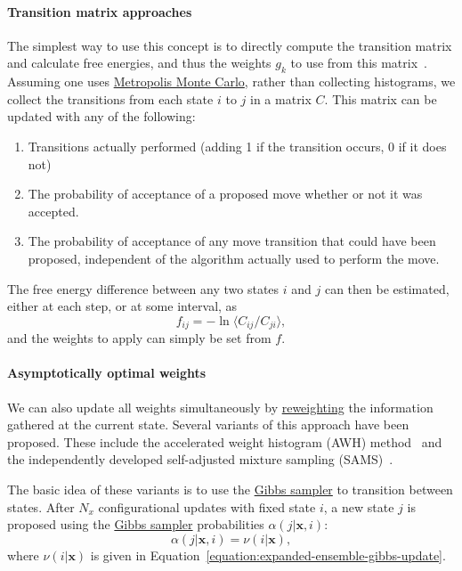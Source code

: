 \documentclass[9pt,review]{livecoms}
\newcommand{\vx}{\mathbf{x}}
\begin{document}
\paragraph{Transition matrix approaches}
The simplest way to use this concept is to directly compute the transition matrix and calculate free energies, and thus the weights $g_k$ to use from this matrix~\cite{siderius_2013}. Assuming one uses \hyperlink{ref:MetropolisMonteCarlo} {Metropolis Monte Carlo}, rather than collecting histograms, we collect the transitions from each state $i$ to $j$ in a matrix $C$. This matrix can be updated with any of the following:
\begin{enumerate}
\item Transitions actually performed (adding 1 if the transition occurs, 0 if it does not)\label{item:actual}
\item The probability of acceptance of a proposed move whether or not it was accepted.\label{item:proposal}
\item The probability of acceptance of any move transition that could have been proposed, independent of the algorithm actually used to perform the move. \label{item:transition}
\end{enumerate}

The free energy difference between any two states $i$ and $j$ can then be estimated, either at each step, or at some interval, as
\begin{equation}
f_{ij} = - \ln \langle C_{ij}/C_{ji} \rangle,
\label{eq:transitionmc}
\end{equation}
and the weights to apply can simply be set from $f$.

\paragraph{Asymptotically optimal weights}
We can also update all weights simultaneously by \hyperlink{ref:Reweighting} {reweighting} the information gathered at the current state. Several variants of this approach have been proposed. These include the accelerated weight histogram (AWH) method~\cite{Lidmar2012} and the independently developed self-adjusted mixture sampling (SAMS)~\cite{tan_optimally_2017}.

The basic idea of these variants is to use the \hyperlink{ref:GibbsSampler} {Gibbs sampler} to transition between states. After $N_x$ configurational updates with fixed state $i$, a new state $j$ is proposed using the \hyperlink{ref:GibbsSampler} {Gibbs sampler} probabilities $\alpha(j|\vx, i)$:
\begin{equation}\label{eq:gibbsproposal}
  \alpha(j|\vx, i) = \nu(i|\vx),
\end{equation}
where $\nu(i|\vx)$ is given in Equation~\ref{equation:expanded-ensemble-gibbs-update}.
\end{document}
